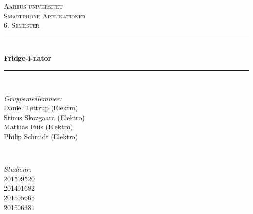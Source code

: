 \documentclass[12pt]{article}
\begin{document}
	
	\begin{titlepage}
		
		
		
		\newcommand{\HRule}{\rule{\linewidth}{0.5mm}} %
		\setlength{\topmargin}{0in}
		\centering %
		
		\textsc{\LARGE Aarhus universitet}\\[1.5cm] %
		\textsc{\Large Smartphone Applikationer}\\[0.5cm] %
		\textsc{\large 6. Semester}\\[0.5cm] %
		
		
		\HRule \\[0.4cm]
		{ \huge \bfseries Fridge-i-nator}\\ %
		\HRule \\[1cm]
		
		
		\begin{minipage}{0.4\textwidth}
			\begin{flushleft} \large
				\emph{Gruppemedlemmer:}\\
				Daniel Tøttrup (Elektro) \\
				Stinus Skovgaard (Elektro) \\
				Mathias Friis (Elektro) \\
				Philip Schmidt (Elektro) \\
			\end{flushleft}
		\end{minipage}
		~
		\begin{minipage}{0.4\textwidth}
			\begin{flushright} \large
				\emph{Studienr:} \\
				201509520\\
				201401682\\
				201505665 \\
				201506381 \\
			\end{flushright}
		\end{minipage}\\[5cm]
		

\end{titlepage}
\end{document}
